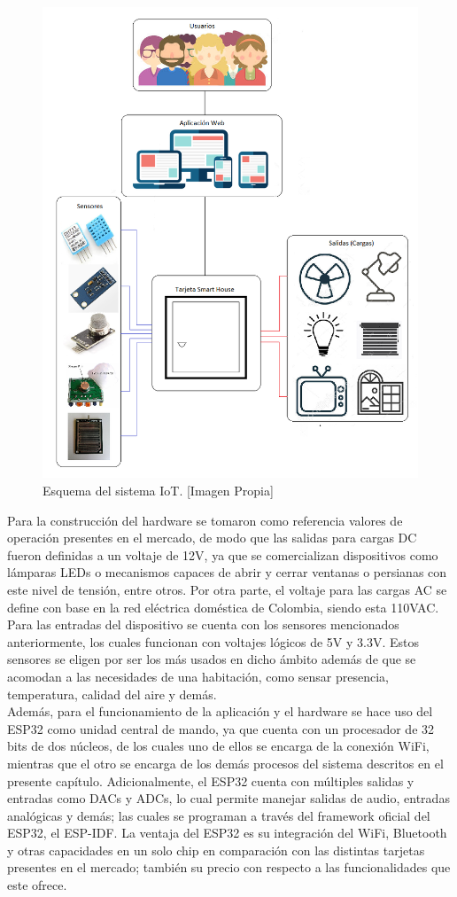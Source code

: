 \begin{figure}[!t]
	\centering
	\caption[Esquema del sistema IoT.]{Esquema del sistema IoT. [Imagen Propia]}
	\label{fig:diagramas}
	\includegraphics[width=0.5\linewidth]{Imagenes/Diagramas}
\end{figure}

Para la construcción del hardware se tomaron como referencia valores de operación presentes en el mercado, de modo que las salidas para cargas DC fueron definidas a un voltaje de 12V, ya que se comercializan dispositivos como lámparas LEDs o mecanismos capaces de abrir y cerrar ventanas o persianas con este nivel de tensión, entre otros. Por otra parte, el voltaje para las cargas AC se define con base en la red eléctrica doméstica de Colombia, siendo esta 110VAC. Para las entradas del dispositivo se cuenta con los sensores mencionados anteriormente, los cuales funcionan con voltajes lógicos de 5V y 3.3V. Estos sensores se eligen por ser los más usados en dicho ámbito además de que se acomodan a las necesidades de una habitación, como sensar presencia, temperatura, calidad del aire y demás.\\

Además, para el funcionamiento de la aplicación y el hardware se hace uso del ESP32 como unidad central de mando, ya que cuenta con un procesador de 32 bits de dos núcleos, de los cuales uno de ellos se encarga de la conexión WiFi, mientras que el otro se encarga de los demás procesos del sistema descritos en el presente capítulo. Adicionalmente, el ESP32 cuenta con múltiples salidas y entradas como DACs y ADCs, lo cual permite manejar salidas de audio, entradas analógicas y demás; las cuales se programan a través del framework oficial del ESP32, el ESP-IDF. La ventaja del ESP32 es su integración del WiFi, Bluetooth y otras capacidades en un solo chip en comparación con las distintas tarjetas presentes en el mercado; también su precio con respecto a las funcionalidades que este ofrece.\\

